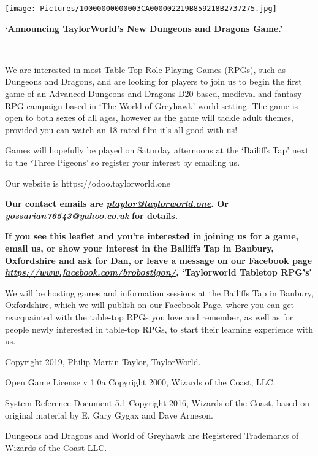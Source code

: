 \texttt{[image: Pictures/10000000000003CA000002219B859218B2737275.jpg]}

\textbf{`Announcing TaylorWorld's New Dungeons and Dragons Game.'}

---

We are interested in most Table Top Role-Playing Games (RPGs), such as
Dungeons and Dragons, and are looking for players to join us to begin
the first game of an Advanced Dungeons and Dragons D20 based, medieval
and fantasy RPG campaign based in `The World of Greyhawk' world setting.
The game is open to both sexes of all ages, however as the game will
tackle adult themes, provided you can watch an 18 rated film it's all
good with us!

Games will hopefully be played on Saturday afternoons at the `Bailiffs
Tap' next to the `Three Pigeons' so register your interest by emailing
us.

Our website is https://odoo.taylorworld.one

\textbf{Our contact emails are
}\href{mailto:ptaylor@taylorworld.one}{\emph{\emph{\textbf{ptaylor@taylorworld.one}}}}\textbf{.
Or
}\href{mailto:yossarian76543@yahoo.co.uk}{\emph{\emph{\textbf{yossarian76543@yahoo.co.uk}}}}\textbf{
for details.}

\textbf{If you see this leaﬂet and you're interested in joining us for a
game, email us, or show your interest in the Bailiﬀs Tap in Banbury,
Oxfordshire and ask for Dan, or leave a message on our Facebook page
}\href{https://www.facebook.com/brobostigon/}{\emph{\emph{\textbf{https://www.facebook.com/brobostigon/}}}}\textbf{,
`Taylorworld Tabletop RPG's'}

We will be hosting games and information sessions at the Bailiﬀs Tap in
Banbury, Oxfordshire, which we will publish on our Facebook Page, where
you can get reacquainted with the table-top RPGs you love and remember,
as well as for people newly interested in table-top RPGs, to start their
learning experience with us.

Copyright 2019, Philip Martin Taylor, TaylorWorld.

Open Game License v 1.0a Copyright 2000, Wizards of the Coast, LLC.

System Reference Document 5.1 Copyright 2016, Wizards of the Coast,
based on original material by E. Gary Gygax and Dave Arneson.

Dungeons and Dragons and World of Greyhawk are Registered Trademarks of
Wizards of the Coast LLC.
